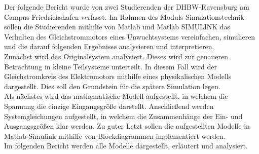 \label{kurzfassung}

Der folgende Bericht wurde von zwei Studierenden der \ac{DHBW}-Ravensburg am Campus Friedrichshafen verfasst. Im Rahmen des Moduls Simulationstechnik sollen die Studierenden mithilfe von Matlab und Matlab SIMULINK das Verhalten des Gleichstrommotors eines Unwuchtsystems vereinfachen, simulieren und die darauf folgenden Ergebnisse analysieren und interpretieren. \\
Zunächst wird das Originalsystem analysiert. Dieses wird zur genaueren Betrachtung in kleine Teilsysteme unterteilt. In diesem Fall wird der Gleichstromkreis des Elektromotors mithilfe eines physikalischen Modells dargestellt. Dies soll den Grundstein für die spätere Simulation legen. \\
Als nächstes wird das mathematische Modell aufgestellt, in welchem die Spannung die einzige Eingangsgröße darstellt. Anschließend werden Systemgleichungen aufgestellt, in welchem die Zusammenhänge der Ein- und Ausgangsgrößen klar werden. Zu guter Letzt sollen die aufgestellten Modelle in Matlab-Simulink mithilfe von Blockdiagrammen implementiert werden. \\
Im folgenden Bericht werden alle Modelle dargestellt, erläutert und analysiert.
